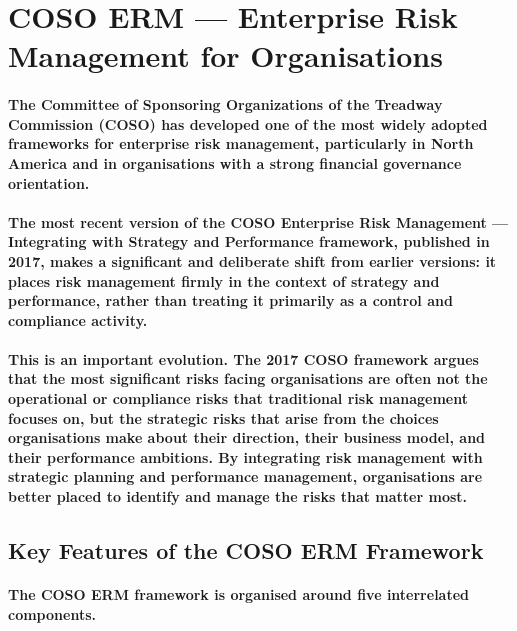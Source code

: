 \section{COSO ERM — Enterprise Risk Management for Organisations}
\paragraph{\textbf{The Committee of Sponsoring Organizations of the Treadway Commission (COSO)} has developed one of the most widely adopted frameworks for enterprise risk management, particularly in North America and in organisations with a strong financial governance orientation.}
\paragraph{The most recent version of the COSO \textbf{Enterprise Risk Management — Integrating with Strategy and Performance} framework, published in 2017, makes a significant and deliberate shift from earlier versions: it places risk management firmly in the context of \textbf{strategy and performance}, rather than treating it primarily as a control and compliance activity.}
\paragraph{This is an important evolution. The 2017 COSO framework argues that the most significant risks facing organisations are often not the operational or compliance risks that traditional risk management focuses on, but the strategic risks that arise from the choices organisations make about their direction, their business model, and their performance ambitions. By integrating risk management with strategic planning and performance management, organisations are better placed to identify and manage the risks that matter most.}
\subsection{Key Features of the COSO ERM Framework}
\paragraph{The COSO ERM framework is organised around five interrelated components.}
\begin{itemize}
\end{itemize}
